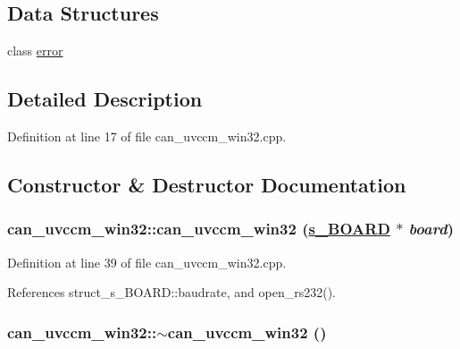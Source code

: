 \subsection*{Data Structures}
\begin{CompactItemize}
\item 
class \hyperlink{classcan__uvccm__win32_1_1error}{error}
\end{CompactItemize}


\subsection{Detailed Description}




Definition at line 17 of file can\_\-uvccm\_\-win32.cpp.

\subsection{Constructor \& Destructor Documentation}
\hypertarget{classcan__uvccm__win32_f4f6d1f25174fd3b7d897a5f73bc363e}{
\subsubsection[can\_\-uvccm\_\-win32]{\setlength{\rightskip}{0pt plus 5cm}can\_\-uvccm\_\-win32::can\_\-uvccm\_\-win32 (\hyperlink{structstruct__s__BOARD}{s\_\-BOARD} $\ast$ {\em board})}}
\label{classcan__uvccm__win32_f4f6d1f25174fd3b7d897a5f73bc363e}




Definition at line 39 of file can\_\-uvccm\_\-win32.cpp.

References struct\_\-s\_\-BOARD::baudrate, and open\_\-rs232().\hypertarget{classcan__uvccm__win32_39bb5c7bb141391d0f2f34b7dd5f487c}{
\subsubsection[$\sim$can\_\-uvccm\_\-win32]{\setlength{\rightskip}{0pt plus 5cm}can\_\-uvccm\_\-win32::$\sim$can\_\-uvccm\_\-win32 ()}}
\label{classcan__uvccm__win32_39bb5c7bb141391d0f2f34b7dd5f487c}




